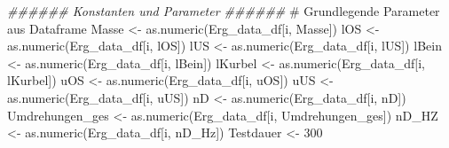 \documentclass[
  letterpaper,
  DIV=11]{scrartcl}
\newenvironment{Shaded}{\begin{snugshade}}{\end{snugshade}}
\newcommand{\CommentTok}[1]{\textcolor[rgb]{0.37,0.37,0.37}{#1}}
\newcommand{\DecValTok}[1]{\textcolor[rgb]{0.68,0.00,0.00}{#1}}
\newcommand{\DocumentationTok}[1]{\textcolor[rgb]{0.37,0.37,0.37}{\textit{#1}}}
\newcommand{\FunctionTok}[1]{\textcolor[rgb]{0.28,0.35,0.67}{#1}}
\newcommand{\NormalTok}[1]{\textcolor[rgb]{0.00,0.23,0.31}{#1}}
\newcommand{\OtherTok}[1]{\textcolor[rgb]{0.00,0.23,0.31}{#1}}
\newcommand{\StringTok}[1]{\textcolor[rgb]{0.13,0.47,0.30}{#1}}
\begin{document}
\begin{Shaded}
\begin{Highlighting}[]
\DocumentationTok{\#\#\#\#\#\# Konstanten und Parameter \#\#\#\#\#\#}
\CommentTok{\# Grundlegende Parameter aus Dataframe}
\NormalTok{Masse }\OtherTok{\textless{}{-}} \FunctionTok{as.numeric}\NormalTok{(Erg\_data\_df[i, }\StringTok{\textquotesingle{}Masse\textquotesingle{}}\NormalTok{])}
\NormalTok{lOS }\OtherTok{\textless{}{-}} \FunctionTok{as.numeric}\NormalTok{(Erg\_data\_df[i, }\StringTok{\textquotesingle{}lOS\textquotesingle{}}\NormalTok{])}
\NormalTok{lUS }\OtherTok{\textless{}{-}} \FunctionTok{as.numeric}\NormalTok{(Erg\_data\_df[i, }\StringTok{\textquotesingle{}lUS\textquotesingle{}}\NormalTok{])}
\NormalTok{lBein }\OtherTok{\textless{}{-}} \FunctionTok{as.numeric}\NormalTok{(Erg\_data\_df[i, }\StringTok{\textquotesingle{}lBein\textquotesingle{}}\NormalTok{])}
\NormalTok{lKurbel }\OtherTok{\textless{}{-}} \FunctionTok{as.numeric}\NormalTok{(Erg\_data\_df[i, }\StringTok{\textquotesingle{}lKurbel\textquotesingle{}}\NormalTok{])}
\NormalTok{uOS }\OtherTok{\textless{}{-}} \FunctionTok{as.numeric}\NormalTok{(Erg\_data\_df[i, }\StringTok{\textquotesingle{}uOS\textquotesingle{}}\NormalTok{])}
\NormalTok{uUS }\OtherTok{\textless{}{-}} \FunctionTok{as.numeric}\NormalTok{(Erg\_data\_df[i, }\StringTok{\textquotesingle{}uUS\textquotesingle{}}\NormalTok{])}
\NormalTok{nD }\OtherTok{\textless{}{-}} \FunctionTok{as.numeric}\NormalTok{(Erg\_data\_df[i, }\StringTok{\textquotesingle{}nD\textquotesingle{}}\NormalTok{])}
\NormalTok{Umdrehungen\_ges }\OtherTok{\textless{}{-}} \FunctionTok{as.numeric}\NormalTok{(Erg\_data\_df[i, }\StringTok{\textquotesingle{}Umdrehungen\_ges\textquotesingle{}}\NormalTok{])}
\NormalTok{nD\_HZ }\OtherTok{\textless{}{-}} \FunctionTok{as.numeric}\NormalTok{(Erg\_data\_df[i, }\StringTok{\textquotesingle{}nD\_Hz\textquotesingle{}}\NormalTok{])}
\NormalTok{Testdauer }\OtherTok{\textless{}{-}} \DecValTok{300}


\end{Highlighting}
\end{Shaded}
\end{document}

